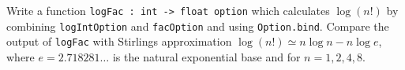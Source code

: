 Write a function \lstinline{logFac : int -> float option} which calculates $\log(n!)$ by combining \lstinline{logIntOption} and \lstinline{facOption} and using \lstinline{Option.bind}. Compare the output of \lstinline{logFac} with Stirlings approximation $\log(n!)\simeq n\log n - n\log e$, where $e=2.718281\dots$ is the natural exponential base and for $n= 1, 2, 4, 8$.